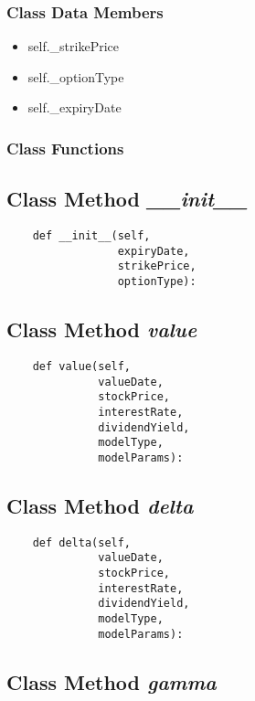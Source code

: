 \documentclass[twoside,11pt]{book}
\begin{document}
\subsubsection{Class Data Members}
\begin{itemize}
\item{self.\_strikePrice}
\item{self.\_optionType}
\item{self.\_expiryDate}
\end{itemize}

\subsubsection{Class Functions}

\subsection{Class Method {\it \_\_init\_\_}}


\begin{lstlisting}
    def __init__(self,
                 expiryDate,
                 strikePrice,
                 optionType):
\end{lstlisting}

\subsection{Class Method {\it value}}


\begin{lstlisting}
    def value(self,
              valueDate,
              stockPrice,
              interestRate,
              dividendYield,
              modelType,
              modelParams):
\end{lstlisting}

\subsection{Class Method {\it delta}}


\begin{lstlisting}
    def delta(self,
              valueDate,
              stockPrice,
              interestRate,
              dividendYield,
              modelType,
              modelParams):
\end{lstlisting}

\subsection{Class Method {\it gamma}}
\end{document}
